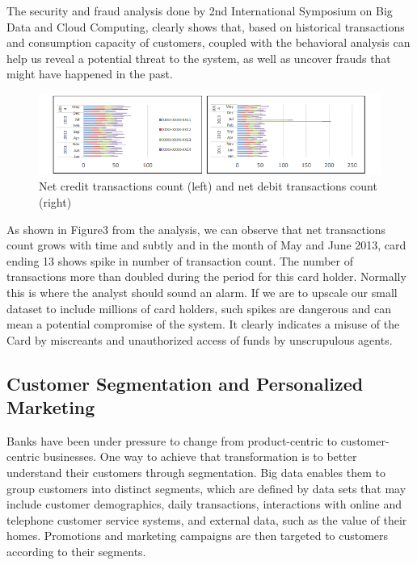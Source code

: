 \documentclass[sigconf]{acmart}
\begin{document}
The security and fraud analysis done by 2nd International Symposium on Big Data and Cloud Computing, clearly shows that, based on historical transactions and consumption capacity of customers, coupled with the behavioral analysis can help us reveal a potential threat to the system, as well as uncover frauds that might have happened in the past\cite{bigdata-banking}. 

\begin{figure}
  \centering
  \includegraphics[width=\textwidth]{images/Figure3.png}
  \caption{Net credit transactions count (left) and net debit transactions count (right) 
  \cite{bigdata-banking}}
  \label{fig:Figure3} 
\end{figure}

As shown in Figure3 from the analysis, we can observe that net transactions count grows with time and subtly and in the month of May and June 2013, card ending 13 shows spike in number of transaction count. The number of transactions more than doubled during the period for this card holder. Normally this is where the analyst should sound an alarm. If we are to upscale our small dataset to include millions of card holders, such spikes are dangerous and can mean a potential compromise of the system. It clearly indicates a misuse of the Card by miscreants and unauthorized access of funds by unscrupulous agents.



\subsection{Customer Segmentation and Personalized Marketing}

Banks have been under pressure to change from product-centric to customer-centric businesses. One way to achieve that transformation is to better understand their customers through segmentation. Big data enables them to group customers into distinct segments, which are defined by data sets that may include customer demographics, daily transactions, interactions with online and telephone customer service systems, and external data, such as the value of their homes. Promotions and marketing campaigns are then targeted to customers according to their segments\cite{5-big-data-use-cases-in-banking-and-financial-services}.
\end{document}
